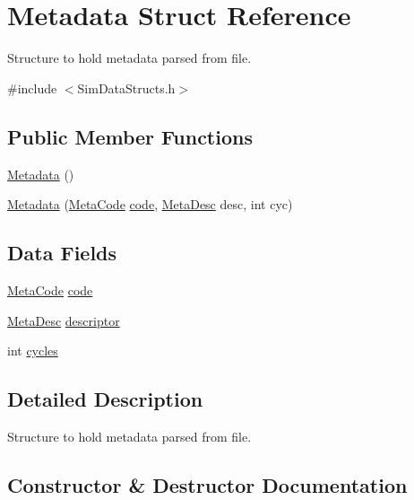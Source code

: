 \hypertarget{struct_metadata}{}\section{Metadata Struct Reference}
\label{struct_metadata}


Structure to hold metadata parsed from file.  




{\ttfamily \#include $<$Sim\+Data\+Structs.\+h$>$}

\subsection*{Public Member Functions}
\begin{DoxyCompactItemize}
\item 
\hyperlink{struct_metadata_a21a1a8f0861128ad03cc8d31eeb1298a}{Metadata} ()
\item 
\hyperlink{struct_metadata_a5ff361e275630c284655d0e4d7e9667e}{Metadata} (\hyperlink{_sim_data_structs_8h_af2e7854cb25f6e7ebcac71cd2dd88516}{Meta\+Code} \hyperlink{struct_metadata_aaaa34653675e35de31549f6dd8eeec3c}{code}, \hyperlink{_sim_data_structs_8h_abb2b49b699fce2da44bb66f1b315b6d6}{Meta\+Desc} desc, int cyc)
\end{DoxyCompactItemize}
\subsection*{Data Fields}
\begin{DoxyCompactItemize}
\item 
\hyperlink{_sim_data_structs_8h_af2e7854cb25f6e7ebcac71cd2dd88516}{Meta\+Code} \hyperlink{struct_metadata_aaaa34653675e35de31549f6dd8eeec3c}{code}
\item 
\hyperlink{_sim_data_structs_8h_abb2b49b699fce2da44bb66f1b315b6d6}{Meta\+Desc} \hyperlink{struct_metadata_a804975d4ed7c782df03c2f3bc55901f3}{descriptor}
\item 
int \hyperlink{struct_metadata_a08201dc6b46eb3d7adca3b1193d28edc}{cycles}
\end{DoxyCompactItemize}


\subsection{Detailed Description}
Structure to hold metadata parsed from file. 

\subsection{Constructor \& Destructor Documentation}
\hypertarget{struct_metadata_a21a1a8f0861128ad03cc8d31eeb1298a}{}\label{struct_metadata_a21a1a8f0861128ad03cc8d31eeb1298a} 
